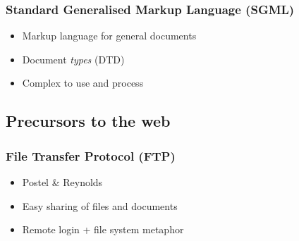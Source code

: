
\usebackgroundtemplate{}




\frame
{
	\frametitle{Standard Generalised Markup Language (SGML)}

	\begin{itemize}
	
		\item Markup language for general documents
		
		\item Document \emph{types} (DTD)
		
		
		\item Complex to use and process
	
	\end{itemize}
	
}




\subsection*{Precursors to the web}




\frame
{
	\frametitle{File Transfer Protocol (FTP)}

	\begin{itemize}
	
		\item Postel \& Reynolds
	
		\item Easy sharing of files and documents
		
		\item Remote login + file system metaphor
	
	\end{itemize}
	
}


